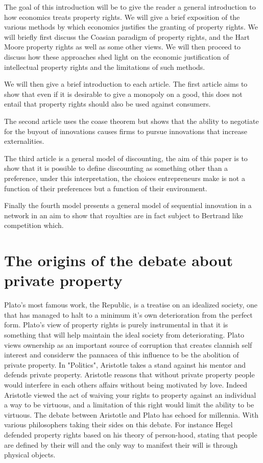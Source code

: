 \documentclass[12pt]{article}
\numberwithin{equation}{section}
\begin{document}
The goal of this introduction will be to give the reader a general introduction to how economics treats property rights. We will give a brief exposition of the various methods by which economics justifies the granting of property rights. We will briefly first discuss the Coasian paradigm of property rights, and the Hart Moore property rights as well as some other views. We will then proceed to discuss how these approaches shed light on the economic justification of intellectual property rights and the limitations of such methods. 

We will then give a brief introduction to each article. 
The first article aims to show that even if it is desirable to give a monopoly on a good, this does not entail that property rights should also be used against consumers. 

The second article uses the coase theorem but shows that the ability to negotiate for the buyout of innovations causes firms to pursue innovations that increase externalities. 

The third article is a general model of discounting, the aim of this paper is to show that it is possible to define discounting as something other than a preference, under this interpretation, the choices entrepreneurs make is not a function of their preferences but a function of their environment. 

Finally the fourth model presents a general model of sequential innovation in a network in an aim to show that royalties are in fact subject to Bertrand like competition which.

\section{The origins of the debate about private property}

Plato's most famous work, the Republic, is a treatise on an idealized society, one that has managed to halt to a minimum it's own deterioration from the perfect form. Plato's view of property rights is purely instrumental in that it is something that will help maintain the ideal society from deteriorating. Plato views ownership as an important source of corruption that creates clannish self interest and considerw the pannacea of this influence to be the abolition of private property. 
In "Politics", Aristotle takes a stand against his mentor and defends private property. Aristotle reasons that without private property people would interfere in each others affairs without being motivated by love. Indeed Aristotle viewed the act of waiving your rights to property against an individual a way to be virtuous, and a limitation of this right would limit the ability to be virtuous. The debate between Aristotle and Plato has echoed for millennia. With various philosophers taking their sides on this debate. For instance Hegel defended property rights based on his theory of person-hood, stating that people are defined by their will and the only way to manifest their will is through physical objects. 
\end{document}
